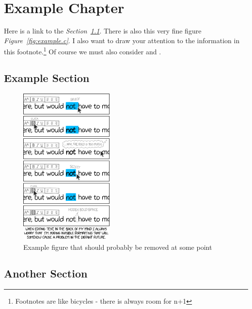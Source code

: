 \chapter{Example Chapter}
\label{chap:example}

Here is a link to the {\textit{Section~\ref{sec:example.examplesec}}}. There is also this very fine figure {\textit{Figure~\ref{fig:example.c}}}. I also want to draw your attention to the information in this footnote.\footnote{Footnotes are like bicycles - there is always room for n+1} Of course we must also consider \cite{leach2018iain} and \cite{martin2021shadow}.

\lipsum[1]

\section{Example Section}
\label{sec:example.examplesec}

\lipsum[2]

\begin{figure}[h!]
	\centering
	\captionsetup{justification=centering}
	\includegraphics[height=8cm]{images/examples/xkcd_2109_invisible_formatting_2x.png}
	\caption[Example figure A]{Example figure that should probably be removed at some point\protect\footnotemark}
	\label{fig:example.a}
\end{figure}


\section{Another Section}
\label{sec:example.another}

\newpage

\lipsum[3]

